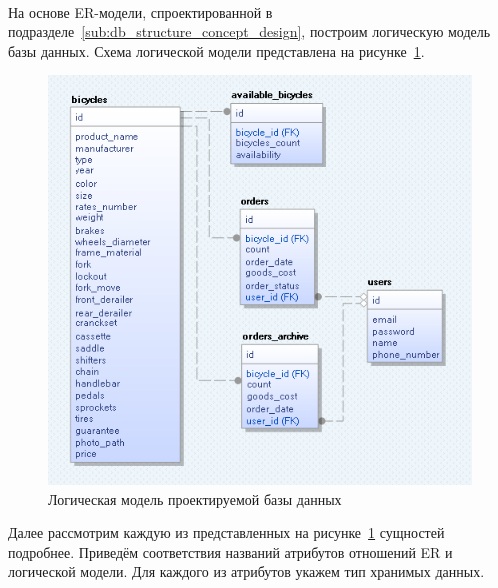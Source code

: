 \paragraph{}
На основе ER-модели, спроектированной в подразделе~\ref{sub:db_structure_concept_design},
построим логическую модель базы данных. Схема логической модели
представлена на рисунке~\ref{fig:logical_model}.
\begin{figure}[h]
  \centering
  \includegraphics[width=150mm]{pic/logical_model.png}
  \caption{Логическая модель проектируемой базы данных}
  \label{fig:logical_model}
\end{figure}

Далее рассмотрим каждую из представленных на рисунке~\ref{fig:logical_model} сущностей
подробнее. Приведём соответствия названий атрибутов отношений ER и логической модели.
Для каждого из атрибутов укажем тип хранимых данных.

\pagebreak

